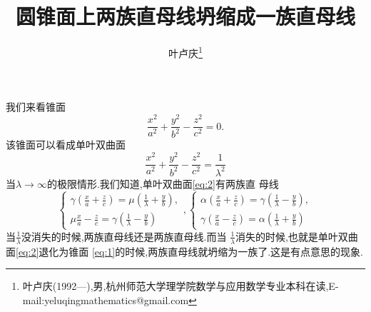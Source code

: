 \documentclass[a4paper]{article}
\begin{document}
\title{\huge{\bf{圆锥面上两族直母线坍缩成一族直母线}}} \author{\small{叶卢庆\footnote{叶卢庆(1992---),男,杭州师范大学理学院数学与应用数学专业本科在读,E-mail:yeluqingmathematics@gmail.com}}}
\maketitle
我们来看锥面
\begin{equation}
  \label{eq:1}
  \frac{x^2}{a^2}+\frac{y^2}{b^2}-\frac{z^2}{c^2}=0.
\end{equation}
该锥面可以看成单叶双曲面
\begin{equation}
  \label{eq:2}
  \frac{x^2}{a^2}+\frac{y^2}{b^2}-\frac{z^2}{c^2}=\frac{1}{\lambda^2}
\end{equation}
当$\lambda\to\infty$的极限情形.我们知道,单叶双曲面\eqref{eq:2}有两族直
母线
$$
\begin{cases}
  \gamma(\frac{x}{a}+\frac{z}{c})= \mu(\frac{1}{\lambda}+\frac{y}{b}),\\
\mu\frac{x}{a}-\frac{z}{c}=\gamma (\frac{1}{\lambda}-\frac{y}{b})
\end{cases},
\begin{cases}
  \alpha(\frac{x}{a}+\frac{z}{c})=\gamma(\frac{1}{\lambda}-\frac{y}{b}),\\
\gamma(\frac{x}{a}-\frac{z}{c})=\alpha (\frac{1}{\lambda}+\frac{y}{b})  
\end{cases}
$$
当$\frac{1}{\lambda}$没消失的时候,两族直母线还是两族直母线.而当
$\frac{1}{\lambda}$消失的时候,也就是单叶双曲面\eqref{eq:2}退化为锥面
\eqref{eq:1}的时候,两族直母线就坍缩为一族了.这是有点意思的现象.
\end{document}

